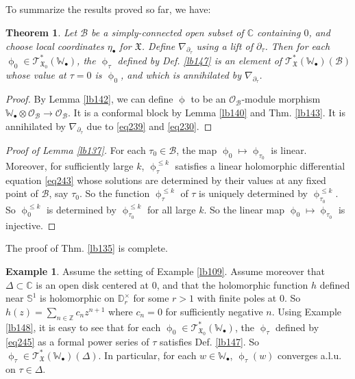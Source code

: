 \documentclass[11pt,b5paper,notitlepage]{article}
\theoremstyle{definition}
\newtheorem{eg}[df]{Example}
\theoremstyle{plain}
\newtheorem{thm}[df]{Theorem}
\newcommand{\fk}{\mathfrak}
\newcommand{\mc}{\mathcal}
\newcommand{\scr}{\mathscr}
\newcommand{\blt}{\bullet}
\newcommand{\Wbb}{\mathbb W}
\newcommand{\Cbb}{\mathbb C}
\newcommand{\Zbb}{\mathbb Z}
\newcommand{\Dbb}{\mathbb D}
\newcommand{\Sbb}{{\mathbb S}}
\numberwithin{equation}{section}
\begin{document}
\subsection{}

To summarize the results proved so far, we have:
\begin{thm}\label{lb145}
Let $\mc B$ be a simply-connected open subset of $\Cbb$ containing $0$, and choose local coordinates $\eta_\blt$ for $\fk X$. Define $\nabla_{\partial_\tau}$ using a lift of $\partial_\tau$. Then for each $\upphi_0\in\scr T_{\fk X_0}^*(\Wbb_\blt)$, the $\upphi_\tau$ defined by Def. \ref{lb147} is an element of $\scr T^*_{\fk X}(\Wbb_\blt)(\mc B)$ whose value at $\tau=0$ is $\upphi_0$, and which is annihilated by $\nabla_{\partial_\tau}$.
\end{thm}

\begin{proof}
By Lemma \ref{lb142}, we can define $\upphi$ to be an $\scr O_{\mc B}$-module morphism $\Wbb_\blt\otimes\scr O_{\mc B}\rightarrow\scr O_{\mc B}$. It is a conformal block by Lemma \ref{lb140} and Thm. \ref{lb143}. It is annihilated by $\nabla_{\partial_\tau}$ due to \eqref{eq239} and \eqref{eq230}.
\end{proof}



\begin{proof}[Proof of Lemma \ref{lb137}]
For each $\tau_0\in\mc B$, the map $\upphi_0\mapsto\upphi_{\tau_0}$ is linear. Moreover, for sufficiently large $k$, $\upphi_\tau^{\leq k}$ satisfies a linear holomorphic differential equation \eqref{eq243} whose solutions are determined by their values at any fixed point of $\mc B$, say $\tau_0$. So the function $\upphi^{\leq k}_\tau$ of $\tau$ is uniquely determined by $\upphi^{\leq k}_{\tau_0}$. So $\upphi_0^{\leq k}$ is determined by $\upphi_{\tau_0}^{\leq k}$ for all large $k$. So the linear map $\upphi_0\mapsto\upphi_{\tau_0}$ is injective.
\end{proof}


The proof of Thm. \ref{lb135} is complete.


\begin{eg}\label{lb149}
Assume the setting of Example \ref{lb109}. Assume moreover that $\Delta\subset\Cbb$ is an open  disk centered at $0$, and that  the holomorphic function $h$ defined near $\Sbb^1$ is holomorphic on $\Dbb_r^\times$ for some $r>1$ with finite poles at $0$. So $h(z)=\sum_{n\in\Zbb}c_nz^{n+1}$ where $c_n=0$ for sufficiently negative $n$. Using Example \ref{lb148}, it is easy to see that for each $\upphi_0\in\scr T_{\fk X_0}^*(\Wbb_\blt)$, the $\upphi_\tau$ defined by \eqref{eq245} as a formal power series of $\tau$ satisfies Def. \ref{lb147}. So $\upphi_\tau\in\scr T_{\fk X}^*(\Wbb_\blt)(\Delta)$. In particular, for each $w\in\Wbb_\blt$, $\upphi_\tau(w)$ converges a.l.u. on $\tau\in\Delta$.
\end{eg}
\end{document}
